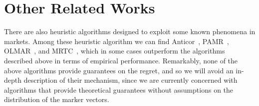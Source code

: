 
\section{Other Related Works}

There are also heuristic algorithms designed to exploit some known phenomena in markets. Among these heuristic algorithm we can find Anticor~\cite{borodin2004can}, PAMR~\cite{li2012pamr}, OLMAR~\cite{li2015moving}, and MRTC~\cite{yang2018reversion}, which in some cases outperform the algorithms described above in terms of empirical performance. 
Remarkably, none of the above algorithms provide guarantees on the regret, and so we will avoid an in-depth description of their mechanism, since we are currently concerned with algorithms that provide theoretical guarantees without assumptions on the distribution of the marker vectors.